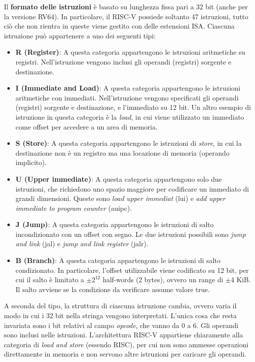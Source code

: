 Il \textbf{formato delle istruzioni} è basato su lunghezza fissa pari a 32 bit (anche per la versione RV64). In particolare, il RISC-V possiede soltanto 47 istruzioni, tutto ciò che non rientra in queste viene gestito con delle estensioni ISA. Ciascuna istruzione può appartenere a uno dei seguenti tipi:
\begin{itemize}
	\item \textbf{R (Register)}: A questa categoria appartengono le istruzioni aritmetiche su registri. Nell'istruzione vengono inclusi gli operandi (registri) sorgente e destinazione.
	\item \textbf{I (Immediate and Load)}: A questa categoria appartengono le istruzioni aritmetiche con immediati. Nell'istruzione vengono specificati gli operandi (registri) sorgente e destinazione, e l'immediato su 12 bit. Un altro esempio di istruzione in questa categoria è la \textit{load}, in cui viene utilizzato un immediato come offset per accedere a un area di memoria.
	\item \textbf{S (Store)}: A questa categoria appartengono le istruzioni di \textit{store}, in cui la destinazione non è un registro ma una locazione di memoria (operando implicito).
	\item \textbf{U (Upper immediate)}: A questa categoria appartengono solo due istruzioni, che richiedono uno spazio maggiore per codificare un immediato di grandi dimensioni. Queste sono \textit{load upper immediat} (lui) e \textit{add upper immediate to program counter} (auipc).
	\item \textbf{J (Jump)}: A questa categoria appartengono le istruzioni di salto incondizionato con un offset con segno. Le due istruzioni possibili sono \textit{jump and link} (jal) e \textit{jump and link register} (jalr).
	\item \textbf{B (Branch)}: A questa categoria appartengono le istruzioni di salto condizionato. In particolare, l'offset utilizzabile viene codificato su 12 bit, per cui il salto è limitato a \(\pm2^{12}\) half-words (2 bytes), ovvero un range di \(\pm\)4 KiB. Il salto avviene se la condizione da verificare assume valore true.
\end{itemize}
A seconda del tipo, la struttura di ciascuna istruzione cambia, ovvero varia il modo in cui i 32 bit nella stringa vengono interpretati. L'unica cosa che resta invariata sono i bit relativi al campo \textit{opcode}, che vanno da 0 a 6. Gli operandi sono inclusi nelle istruzioni. L'architettura RISC-V appartiene chiaramente alla categoria di \textit{load and store} (essendo RISC), per cui non sono ammesse operazioni direttamente in memoria e non servono altre istruzioni per caricare gli operandi.

